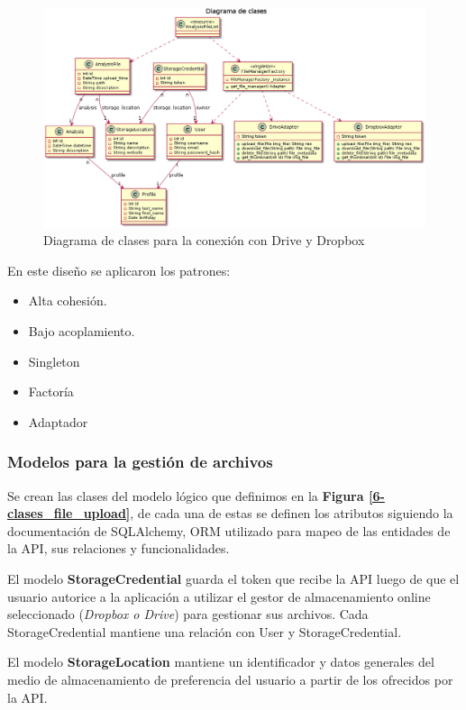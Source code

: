 	\begin{figure}[h]
        \centering
        \includegraphics[width=1\textwidth]{img/dcd_file_upload}
        \caption{Diagrama de clases para la conexión con Drive y Dropbox}
		\label{6-dcd_file_upload}
    \end{figure}
   
\newpage

	En este diseño se aplicaron los patrones:
		\begin{itemize}			
			\item Alta cohesión.
			\item Bajo acoplamiento.
			\item Singleton
			\item Factoría
			\item Adaptador
		\end{itemize}

\subsubsection{Modelos para la gestión de archivos}

Se crean las clases del modelo lógico que definimos en la \textbf{Figura \ref{6-clases_file_upload}}, de cada una de estas se definen los atributos siguiendo la documentación de SQLAlchemy, ORM utilizado para mapeo de las entidades de la API, sus relaciones y funcionalidades. 

El modelo \textbf{StorageCredential} guarda el token que recibe la API luego de que el usuario autorice a la aplicación a utilizar el gestor de almacenamiento online seleccionado (\textit{Dropbox o Drive}) para gestionar sus archivos. Cada StorageCredential mantiene una relación con User y StorageCredential.

El modelo \textbf{StorageLocation} mantiene un identificador y datos generales del medio de almacenamiento de preferencia del usuario a partir de los ofrecidos por la API.

